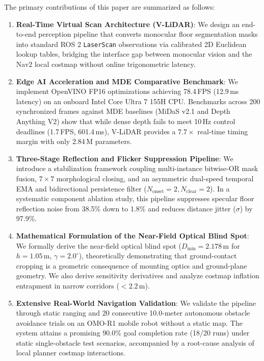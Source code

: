 \documentclass{ieeeaccess}
\begin{document}
The primary contributions of this paper are summarized as follows:
\begin{enumerate}
  \item \textbf{Real-Time Virtual Scan Architecture (V-LiDAR)}: We design an end-to-end perception pipeline that converts monocular floor segmentation masks into standard ROS 2 \texttt{LaserScan} observations via calibrated 2D Euclidean lookup tables, bridging the interface gap between monocular vision and the Nav2 local costmap without online trigonometric latency.
  \item \textbf{Edge AI Acceleration and MDE Comparative Benchmark}: We implement OpenVINO FP16 optimizations achieving 78.4\,FPS (12.9\,ms latency) on an onboard Intel Core Ultra 7 155H CPU. Benchmarks across 200 synchronized frames against MDE baselines (MiDaS v2.1 and Depth Anything V2) show that while dense depth fails to meet 10\,Hz control deadlines (1.7\,FPS, 601.4\,ms), V-LiDAR provides a $7.7\times$ real-time timing margin with only 2.84\,M parameters.
  \item \textbf{Three-Stage Reflection and Flicker Suppression Pipeline}: We introduce a stabilization framework coupling multi-instance bitwise-OR mask fusion, $7 \times 7$ morphological closing, and an asymmetric dual-speed temporal EMA and bidirectional persistence filter ($N_{\mathrm{onset}}=2, N_{\mathrm{clear}}=2$). In a systematic component ablation study, this pipeline suppresses specular floor reflection noise from 38.5\% down to 1.8\% and reduces distance jitter ($\sigma$) by 97.9\%.
  \item \textbf{Mathematical Formulation of the Near-Field Optical Blind Spot}: We formally derive the near-field optical blind spot ($D_{\min} = 2.178$\,m for $h = 1.05$\,m, $\gamma = 2.0^\circ$), theoretically demonstrating that ground-contact cropping is a geometric consequence of mounting optics and ground-plane geometry. We also derive sensitivity derivatives and analyze costmap inflation entrapment in narrow corridors ($<2.2$\,m).
  \item \textbf{Extensive Real-World Navigation Validation}: We validate the pipeline through static ranging and 20 consecutive 10.0-meter autonomous obstacle avoidance trials on an OMO-R1 mobile robot without a static map. The system attains a promising 90.0\% goal completion rate (18/20 runs) under static single-obstacle test scenarios, accompanied by a root-cause analysis of local planner costmap interactions.
\end{enumerate}
\end{document}

